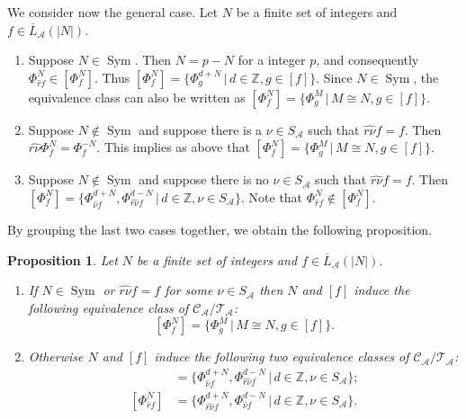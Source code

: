 \documentclass[a4paper]{article}
\newcommand{\Sym}{\mathop{\mathrm{Sym}}}
\newtheorem{prop}{Proposition}
\begin{document}
We consider now the general case.
Let $N$ be a finite set of integers and $f \in \overline{L}_\mathcal{A}(|N|)$.

\begin{enumerate}

\item Suppose $N \in \Sym$.
Then $N = p -N$ for a integer $p$, and consequently $\Phi^{N}_{\hat{r}f} \in [\Phi^{N}_f]$.
Thus $[\Phi^N_f] = \{\Phi^{d+N}_g \, | \, d \in \mathbb{Z}, g \in [f] \}$.
Since $N \in \Sym$, the equivalence class can also be written as
$[\Phi^N_f] = \{\Phi^{M}_g \, | \, M \cong N, g \in [f] \}$.

\item Suppose $N \not\in \Sym$ and suppose there is a $\nu \in S_\mathcal{A}$ such
that $\widehat{r\nu}f = f$.
Then $\widehat{r\nu} \Phi^N_f = \Phi^{-N}_f$.
This implies as above that
$[\Phi^N_f] = \{\Phi^{M}_g \, | \, M \cong N, g \in [f] \}$.

\item Suppose $N \not\in \Sym$ and suppose there is no $\nu \in S_\mathcal{A}$
such that $\widehat{r\nu}f =f$.
Then $[\Phi^N_f] = \{ \Phi^{d+N}_{\hat{\nu}f},  \Phi^{d-N}_{\widehat{r\nu}f} \, | \, d \in \mathbb{Z},
\nu \in S_\mathcal{A} \}$.
Note that $\Phi^N_{\hat{r}f} \not\in [\Phi^N_f]$.

\end{enumerate}
By grouping the last two cases together, we obtain the following proposition.
\begin{prop}
\label{prop:global-eq}
Let $N$ be a finite set of integers and $f \in \overline{L}_\mathcal{A}(|N|)$.
\begin{enumerate}[label=(\roman*)]
\item
\label{prop:global-eq-1}
If $N \in \Sym$ or $\widehat{r\nu}f = f$ for some $\nu \in S_\mathcal{A}$ then
$N$ and $[f]$ induce the following equivalence class of $\mathcal{C}_\mathcal{A} / \mathcal{T}_\mathcal{A}$:
\[
[\Phi^N_f] = \{\Phi^{M}_g \, | \, M \cong N, g \in [f] \}.
\]
\item
\label{prop:global-eq-2}
Otherwise $N$ and $[f]$ induce the following two equivalence classes of $\mathcal{C}_\mathcal{A} / \mathcal{T}_\mathcal{A}$:
\begin{align*}
[\Phi^N_f] & = \{ \Phi^{d+N}_{\hat{\nu}f},  \Phi^{d-N}_{\widehat{r\nu}f} \, | \, d \in \mathbb{Z},
\nu \in S_\mathcal{A} \}; \\
[\Phi^N_{\hat{r}f}] & = \{ \Phi^{d+N}_{\widehat{r\nu}f},  \Phi^{d-N}_{\hat{\nu}f} \, | \, d \in \mathbb{Z},
\nu \in S_\mathcal{A} \}.
\end{align*}
\end{enumerate}
\end{prop}
\end{document}
